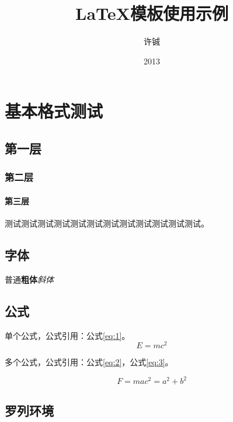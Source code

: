 \documentclass[format=draft,degree=bachelor]{hustthesis}
\title{\LaTeX 模板使用示例}{An Example of Using hustthesis \LaTeX{} Template}
\author{许铖}{Xu Cheng}
\date{2013}{4}{1}
\begin{document}
\frontmatter
\maketitle
\makeabstract
\tableofcontents
\mainmatter

\chapter{基本格式测试}

\section{第一层}
\subsection{第二层}
\subsubsection{第三层}
测试测试测试测试测试测试测试测试测试测试测试测试。

\section{字体}

普通\textbf{粗体}\emph{斜体}


\section{公式}

单个公式，公式引用：公式\ref{eq:1}。
\begin{equation}
  E = mc^2 \label{eq:1}
\end{equation}

多个公式，公式引用：公式\ref{eq:2}，公式\ref{eq:3}。

\begin{subequations}
\begin{equation}
  F = ma \label{eq:2}
\end{equation}
\begin{equation}
  c^2 = a^2 + b^2 \label{eq:3}
\end{equation}
\end{subequations}

\section{罗列环境}
\end{document}
